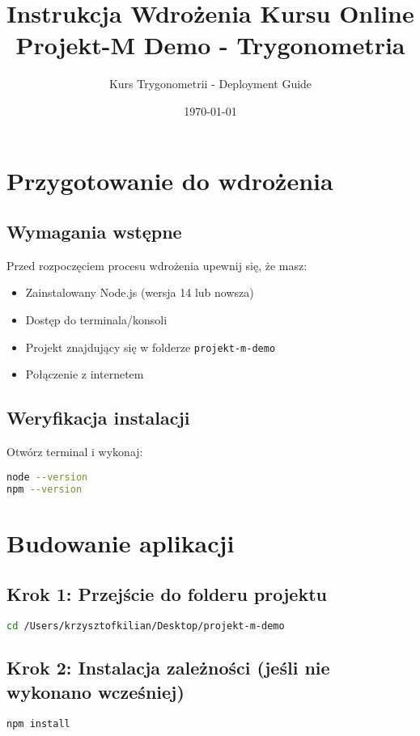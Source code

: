 \documentclass[12pt,a4paper]{article}
\title{\textbf{Instrukcja Wdrożenia Kursu Online}\\
\large Projekt-M Demo - Trygonometria}
\author{Kurs Trygonometrii - Deployment Guide}
\date{\today}
\begin{document}
\maketitle

\tableofcontents
\newpage

\section{Przygotowanie do wdrożenia}

\subsection{Wymagania wstępne}
Przed rozpoczęciem procesu wdrożenia upewnij się, że masz:
\begin{itemize}
    \item Zainstalowany Node.js (wersja 14 lub nowsza)
    \item Dostęp do terminala/konsoli
    \item Projekt znajdujący się w folderze \texttt{projekt-m-demo}
    \item Połączenie z internetem
\end{itemize}

\subsection{Weryfikacja instalacji}
Otwórz terminal i wykonaj:
\begin{lstlisting}[language=bash]
node --version
npm --version
\end{lstlisting}

\section{Budowanie aplikacji}

\subsection{Krok 1: Przejście do folderu projektu}
\begin{lstlisting}[language=bash]
cd /Users/krzysztofkilian/Desktop/projekt-m-demo
\end{lstlisting}

\subsection{Krok 2: Instalacja zależności (jeśli nie wykonano wcześniej)}
\begin{lstlisting}[language=bash]
npm install
\end{lstlisting}
\end{document}
